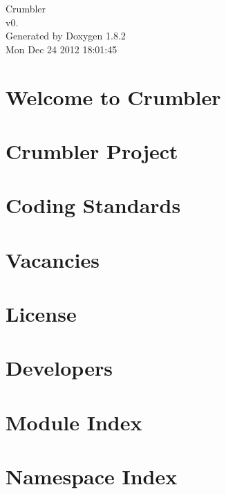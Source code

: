 \documentclass{book}
\begin{document}
\hypersetup{pageanchor=false,citecolor=blue}
\begin{titlepage}
\vspace*{7cm}
\begin{center}
{\Large Crumbler \\[1ex]\large v0. }\\
\vspace*{1cm}
{\large Generated by Doxygen 1.8.2}\\
\vspace*{0.5cm}
{\small Mon Dec 24 2012 18:01:45}\\
\end{center}
\end{titlepage}
\clearemptydoublepage
{}
\tableofcontents
\clearemptydoublepage
{}
\hypersetup{pageanchor=true,citecolor=blue}
\chapter{Welcome to Crumbler}
\label{index}\hypertarget{index}{}
\chapter{Crumbler Project}
\label{proejct}
\hypertarget{proejct}{}

\chapter{Coding Standards}
\label{coding_standards}
\hypertarget{coding_standards}{}

\chapter{Vacancies}
\label{vacancies}
\hypertarget{vacancies}{}

\chapter{License}
\label{license}
\hypertarget{license}{}

\chapter{Developers}
\label{developers}
\hypertarget{developers}{}

\chapter{Module Index}

\chapter{Namespace Index}

\end{document}
